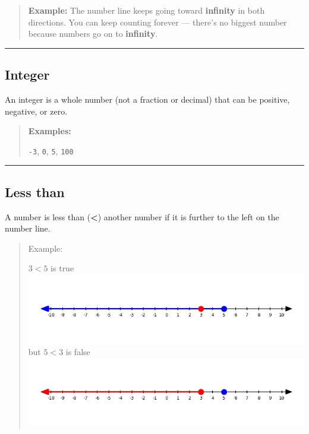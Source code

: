 \documentclass[
  letterpaper,
  DIV=11,
  numbers=noendperiod]{scrreprt}
\begin{document}
\begin{quote}
\textbf{Example:} The number line keeps going toward \textbf{infinity}
in both directions. You can keep counting forever --- there's no biggest
number because numbers go on to \textbf{infinity}.
\end{quote}

\begin{center}\rule{0.5\linewidth}{0.5pt}\end{center}

\subsection*{Integer}\label{glossary-integer}

An integer is a whole number (not a fraction or decimal) that can be
positive, negative, or zero.

\begin{quote}
\textbf{Examples:}

\texttt{-3}, \texttt{0}, \texttt{5}, \texttt{100}
\end{quote}

\begin{center}\rule{0.5\linewidth}{0.5pt}\end{center}

\subsection*{Less than}\label{glossary-less-than}

A number is less than (\textbf{\textless{}}) another number if it is
further to the left on the number line.

\begin{quote}
Example:

\(3 < 5\) is true
\includegraphics[width=1\linewidth,height=\textheight,keepaspectratio]{images/Glossary/less_than_true.png}
but \(5 < 3\) is false
\includegraphics[width=1\linewidth,height=\textheight,keepaspectratio]{images/Glossary/less_than_false.png}
\end{quote}
\end{document}
